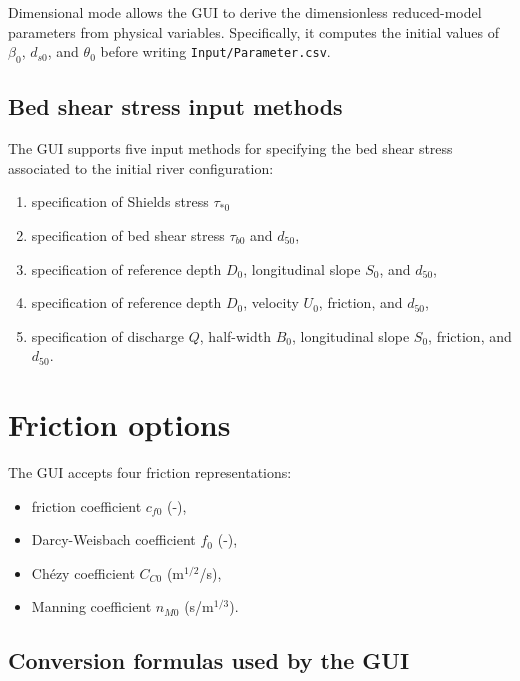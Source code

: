 \documentclass[11pt,a4paper]{article}
\begin{document}
Dimensional mode allows the GUI to derive the dimensionless reduced-model parameters from physical variables. Specifically, it computes the initial values of $\beta_0$, $d_{s0}$, and $\theta_0$ before writing \texttt{Input/Parameter.csv}.

\subsection{Bed shear stress input methods}
\label{ShearStressInput}

The GUI supports five input methods for specifying the bed shear stress associated to the initial river configuration:

\begin{enumerate}[leftmargin=1.4em]
	\item specification of Shields stress $\tau_{*0}$
	\item specification of  bed shear stress $\tau_{b0}$ and  $d_{50}$,
	\item specification of reference depth $D_0$,  longitudinal slope $S_0$, and $d_{50}$,
	\item specification of reference depth $D_0$, velocity $U_0$,  friction, and $d_{50}$,
	\item specification of discharge $Q$, half-width $B_0$, longitudinal slope $S_0$, friction, and $d_{50}$.
\end{enumerate}

\section{Friction options}
\label{FrictionOptions}

The GUI accepts four friction representations:

\begin{itemize}[leftmargin=1.2em]
	\item friction coefficient $c_{f0}$ (-),
	\item Darcy-Weisbach coefficient $f_0$ (-),
	\item Ch\'ezy coefficient $C_{C0}$ (m$^{1/2}$/s),
\item Manning coefficient $n_{M0}$ (s/m$^{1/3}$).
\end{itemize}

\subsection{Conversion formulas used by the GUI}
\end{document}
